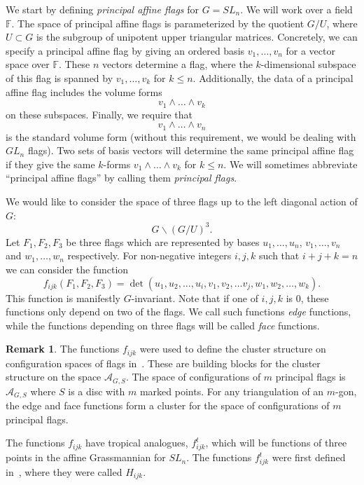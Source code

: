 \documentclass[10pt]{amsart}
\theoremstyle{definition}
\newtheorem{rema}[theorem]{Remark}
\newcommand{\F}{\mathbb{F}}
\newcommand{\A}{\mathcal{A}}
\begin{document}
We start by defining \emph{principal affine flags} for $G=SL_n$. We will work over a field $\F$. The space of principal affine flags is parameterized by the quotient $G/U$, where $U \subset G$ is the subgroup of unipotent upper triangular matrices. Concretely, we can specify a principal affine flag by giving an ordered basis $v_1, \dots, v_n$ for a vector space over $\F$. These $n$ vectors determine a flag, where the $k$-dimensional subspace of this flag is spanned by $v_1, \dots , v_k$ for $k \leq n$. Additionally, the data of a principal affine flag includes the volume forms 
\[
 v_1 \wedge \dots \wedge v_k
\]
 on these subspaces. Finally, we require that 
\[
v_1 \wedge \dots \wedge v_n
\]
 is the standard volume form (without this requirement, we would be dealing with $GL_n$ flags). Two sets of basis vectors will determine the same principal affine flag if they give the same $k$-forms $v_1 \wedge \dots \wedge v_k$ for $k \leq n$. We will sometimes abbreviate ``principal affine flags'' by calling them \emph{principal flags}.

We would like to consider the space of three flags up to the left diagonal action of $G$:
\[
G \backslash (G/U)^3.
\]
Let $F_1, F_2, F_3$ be three flags which are represented by bases $u_1, \dots, u_n$, $v_1, \dots, v_n$ and $w_1, \dots, w_n$ respectively. For non-negative integers $i, j, k$ such that $i+j+k=n$ we can consider the function 
\[
f_{ijk}(F_1, F_2, F_3)=\det(u_1, u_2, \dots, u_i, v_1, v_2, \dots v_j, w_1, w_2, \dots, w_k).
\] 
This function is manifestly $G$-invariant. Note that if one of $i, j, k$ is $0$, these functions only depend on two of the flags. We call such functions {\em edge} functions, while the functions depending on three flags will be called {\em face} functions. 

\begin{rema} The functions $f_{ijk}$ were used to define the cluster structure on configuration spaces of flags in~\cite{FG1}. These are building blocks for the cluster structure on the space $\A_{G,S}$. The space of configurations of $m$ principal flags is $\A_{G,S}$ where $S$ is a disc with $m$ marked points. For any triangulation of an $m$-gon, the edge and face functions form a cluster for the space of configurations of $m$ principal flags.
\end{rema}

The functions $f_{ijk}$ have tropical analogues, $f_{ijk}^t$, which will be functions of three points in the affine Grassmannian for $SL_n$. The functions $f_{ijk}^t$ were first defined in~\cite{K}, where they were called $H_{ijk}$.
\end{document}
